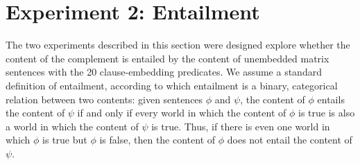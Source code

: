 \documentclass[11pt,fleqn]{article}
\newcommand{\6}{\mbox{$[\hspace*{-.6mm}[$}}
\newcommand{\9}{\mbox{$]\hspace*{-.6mm}]$}}
\begin{document}
 
\section{Experiment 2: Entailment}\label{s3}

The two experiments described in this section were designed explore whether the content of the complement is entailed by the content of unembedded matrix sentences with the 20 clause-embedding predicates. We assume a standard definition of entailment, according to which entailment is a binary, categorical relation between two contents: given sentences $\phi$ and $\psi$, the content of $\phi$ entails the content of $\psi$ if and only if every world in which the content of $\phi$ is true is also a world in which the content of $\psi$ is true. Thus, if there is even one world in which $\phi$ is true but $\phi$ is false, then the content of $\phi$ does not entail the content of $\psi$. 
\end{document}
